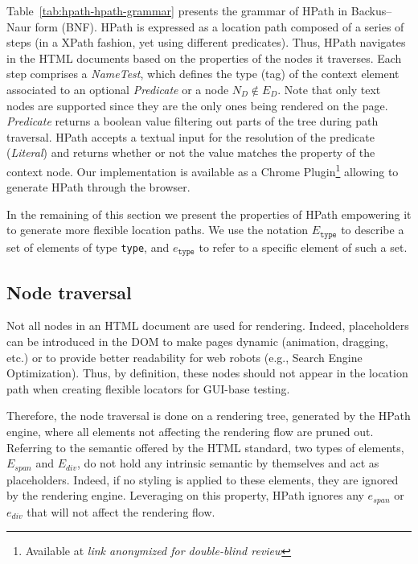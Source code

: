 Table~\ref{tab:hpath-hpath-grammar} presents the grammar of HPath in Backus–Naur form (BNF). HPath is expressed as a location path composed of a series of steps (in a XPath fashion, yet using different predicates). Thus, HPath navigates in the HTML documents based on the properties of the nodes it traverses. Each step comprises a \emph{NameTest}, which defines the type (tag) of the context element associated to an optional \emph{Predicate} or a node $N_D \not\in E_D$. Note that only text nodes are supported since they are the only ones being rendered on the page. \emph{Predicate} returns a boolean value filtering out parts of the tree during path traversal. HPath accepts a textual input for the resolution of the predicate (\emph{Literal}) and returns whether or not the value matches the property of the context node. Our implementation is available as a Chrome Plugin\footnote{Available at \emph{link anonymized for double-blind review}} allowing to generate HPath through the browser.

In the remaining of this section we present the properties of HPath empowering it to generate more flexible location paths. We use the notation $E_{\texttt{type}}$ to describe a set of elements of type \texttt{type}, and $e_\texttt{type}$ to refer to a specific element of such a set.

\subsection{Node traversal}
\label{sec:hpath-hpath-node-traversal}

Not all nodes in an HTML document are used for rendering. Indeed, placeholders can be introduced in the DOM to make pages dynamic (animation, dragging, etc.) or to provide better readability for web robots (e.g., Search Engine Optimization). Thus, by definition, these nodes should not appear in the location path when creating flexible locators for GUI-base testing. 

Therefore, the node traversal is done on a rendering tree, generated by the HPath engine, where all elements not affecting the rendering flow are pruned out. Referring to the semantic offered by the HTML standard, two types of elements, $E_{span}$ and $E_{div}$, do not hold any intrinsic semantic by themselves and act as placeholders. Indeed, if no styling is applied to these elements, they are ignored by the rendering engine\cite{Grigorik2019}. Leveraging on this property, HPath ignores any $e_{span}$ or $e_{div}$ that will not affect the rendering flow.  

